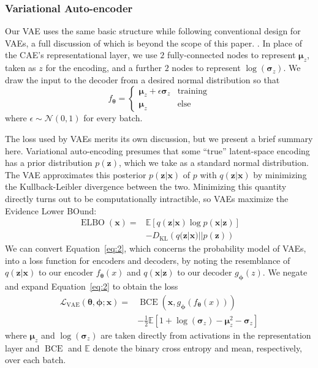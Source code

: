 \documentclass[a4paper]{article}
\def\vec#1{\ensuremath{\bm{{#1}}}}
\DeclareMathOperator{\elbo}{ELBO}
\DeclareMathOperator{\bce}{BCE}
\begin{document}
\subsubsection{Variational Auto-encoder}
\label{sec:vari-auto-encod}

Our VAE uses the same basic structure while following conventional design for
VAEs, a full discussion of which is beyond the scope of this
paper. \cite{kingma_auto-encoding_2013}. In place of the CAE's representational
layer, we use $2$ fully-connected nodes to represent $\vec{\mu}_z$, taken as $z$
for the encoding, and a further $2$ nodes to represent
$\log(\vec{\sigma}_z)$. We draw the input to the decoder from a desired normal
distribution so that
\begin{equation}
  \label{eq:3}
  f_{\vec{\theta}} =
  \begin{cases}
    \vec{\mu}_z + \epsilon \vec{\sigma}_z & \text{training} \\
    \vec{\mu}_z & \text{else}
  \end{cases}
\end{equation}
where $\epsilon \sim \mathcal{N}(0,1)$ for every batch.

The loss used by VAEs merits its own discussion, but we present a brief summary
here. Variational auto-encoding presumes that some ``true'' latent-space
encoding has a prior distribution $p(\vec{z})$, which we take as a standard
normal distribution. The VAE approximates this posterior $p(\vec{z} | \vec{x})$
of $p$ with $q(\vec{z} | \vec{x})$ by minimizing the Kullback-Leibler divergence
between the two. Minimizing this quantity directly turns out to be
computationally intractible, so VAEs maximize the Evidence Lower BOund:
\begin{equation}
  \label{eq:2}
  \begin{split}
    \elbo(\vec{x}) =
    & \mathbb{E}\left[q(\vec{z}|\vec{x})\log p(\vec{x}|\vec{z})\right] \\
    & - D_{\text{KL}}\left(q(\vec{z}|\vec{x})||p(\vec{z})\right)
  \end{split}
\end{equation}
We can convert Equation~\ref{eq:2}, which concerns the probability model of
VAEs, into a loss function for encoders and decoders, by noting the resemblance
of $q(\vec{z}|\vec{x})$ to our encoder $f_{\vec{\theta}}(x)$ and
$q(\vec{x}|\vec{z})$ to our decoder $g_{\vec{\phi}}(z)$. We negate and expand
Equation~\ref{eq:2} to obtain the loss
\begin{equation}
  \label{eq:4}
  \begin{split}
    \mathcal{L}_{\text{VAE}}(\vec{\theta}, \vec{\phi};\vec{x}) =
    & \bce(\vec{x},g_{\vec{\phi}}(f_{\vec{\theta}}(x))) \\
    & - \frac{1}{2}\mathbb{E}\left[1 + \log(\vec{\sigma}_z) - \vec{\mu}_z^2 -
      \vec{\sigma}_z \right]
  \end{split}
\end{equation}
where $\vec{\mu}_z$ and $\log(\vec{\sigma}_z)$ are taken directly from
activations in the representation layer and $\bce$ and $\mathbb{E}$ denote the
binary cross entropy and mean, respectively, over each batch.
\end{document}
